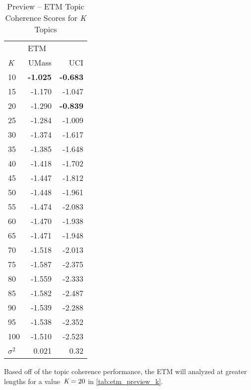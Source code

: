 \documentclass[letterpaper,12pt]{article}
\begin{document}
\begin{table}
	\caption{\label{tab:etm_preview_tc} Preview -- ETM Topic Coherence Scores for \emph{K} Topics}
	\begin{center}
		\begin{tabular}{lrr}
			\toprule
			{} & \multicolumn{2}{l}{ETM} \\
			\emph{K} &  UMass &    UCI \\
			\midrule
			10  & \textbf{-1.025} & \textbf{-0.683} \\
			15  & -1.170 & -1.047 \\
			20  & -1.290 & \textbf{-0.839} \\
			25  & -1.284 & -1.009 \\
			30  & -1.374 & -1.617 \\
			35  & -1.385 & -1.648 \\
			40  & -1.418 & -1.702 \\
			45  & -1.447 & -1.812 \\
			50  & -1.448 & -1.961 \\
			55  & -1.474 & -2.083 \\
			60  & -1.470 & -1.938 \\
			65  & -1.471 & -1.948 \\
			70  & -1.518 & -2.013 \\
			75  & -1.587 & -2.375 \\
			80  & -1.559 & -2.333 \\
			85  & -1.582 & -2.487 \\
			90  & -1.539 & -2.288 \\
			95  & -1.538 & -2.352 \\
			100 & -1.510 & -2.523 \\
			\midrule
			$\sigma^2$ & 0.021 & 0.32 \\
			\bottomrule
			\end{tabular}
	\end{center}
\end{table}

\newpage
Based off of the topic coherence performance, the ETM will analyzed at greater lengths for a value\
$\emph{K} = 20$ in \ref{tab:etm_preview_k}.
\end{document}
